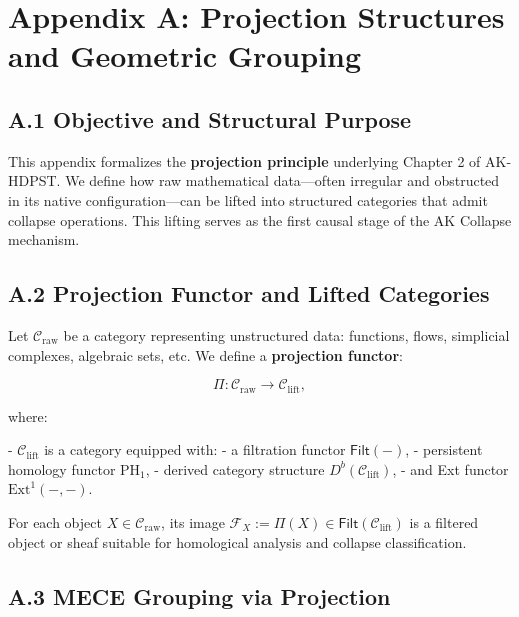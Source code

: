 \documentclass[11pt]{article}
\begin{document}
\section*{Appendix A: Projection Structures and Geometric Grouping}

\subsection*{A.1 Objective and Structural Purpose}

This appendix formalizes the \textbf{projection principle} underlying Chapter 2 of AK-HDPST.  
We define how raw mathematical data—often irregular and obstructed in its native configuration—can be lifted into structured categories that admit collapse operations. This lifting serves as the first causal stage of the AK Collapse mechanism.

\subsection*{A.2 Projection Functor and Lifted Categories}

Let \( \mathcal{C}_{\mathrm{raw}} \) be a category representing unstructured data:  
functions, flows, simplicial complexes, algebraic sets, etc.  
We define a \textbf{projection functor}:

\[
\Pi: \mathcal{C}_{\mathrm{raw}} \longrightarrow \mathcal{C}_{\mathrm{lift}},
\]

where:

- \( \mathcal{C}_{\mathrm{lift}} \) is a category equipped with:
  - a filtration functor \( \mathsf{Filt}(-) \),
  - persistent homology functor \( \mathrm{PH}_1 \),
  - derived category structure \( D^b(\mathcal{C}_{\mathrm{lift}}) \),
  - and Ext functor \( \mathrm{Ext}^1(-, -) \).

For each object \( X \in \mathcal{C}_{\mathrm{raw}} \), its image \( \mathcal{F}_X := \Pi(X) \in \mathsf{Filt}(\mathcal{C}_{\mathrm{lift}}) \) is a filtered object or sheaf suitable for homological analysis and collapse classification.

\subsection*{A.3 MECE Grouping via Projection}
\end{document}
